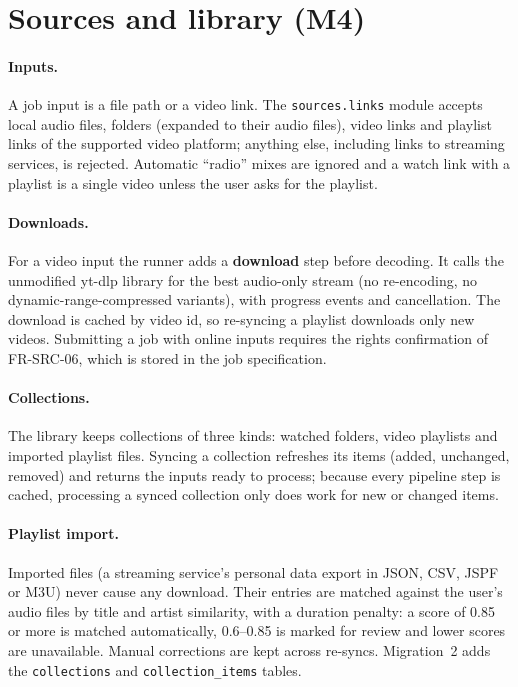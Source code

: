 \documentclass{covermaker}
\begin{document}
\section{Sources and library (M4)}
\paragraph{Inputs.} A job input is a file path or a video link. The
\texttt{sources.links} module accepts local audio files, folders (expanded to
their audio files), video links and playlist links of the supported video
platform; anything else, including links to streaming services, is rejected.
Automatic ``radio'' mixes are ignored and a watch link with a playlist is a
single video unless the user asks for the playlist.

\paragraph{Downloads.} For a video input the runner adds a \textbf{download}
step before decoding. It calls the unmodified yt-dlp library for the best
audio-only stream (no re-encoding, no dynamic-range-compressed variants), with
progress events and cancellation. The download is cached by video id, so
re-syncing a playlist downloads only new videos. Submitting a job with online
inputs requires the rights confirmation of FR-SRC-06, which is stored in the
job specification.

\paragraph{Collections.} The library keeps collections of three kinds: watched
folders, video playlists and imported playlist files. Syncing a collection
refreshes its items (added, unchanged, removed) and returns the inputs ready to
process; because every pipeline step is cached, processing a synced collection
only does work for new or changed items.

\paragraph{Playlist import.} Imported files (a streaming service's personal data
export in JSON, CSV, JSPF or M3U) never cause any download. Their entries are
matched against the user's audio files by title and artist similarity, with a
duration penalty: a score of 0.85 or more is matched automatically, 0.6--0.85 is
marked for review and lower scores are unavailable. Manual corrections are kept
across re-syncs. Migration~2 adds the \texttt{collections} and
\texttt{collection\_items} tables.
\end{document}
